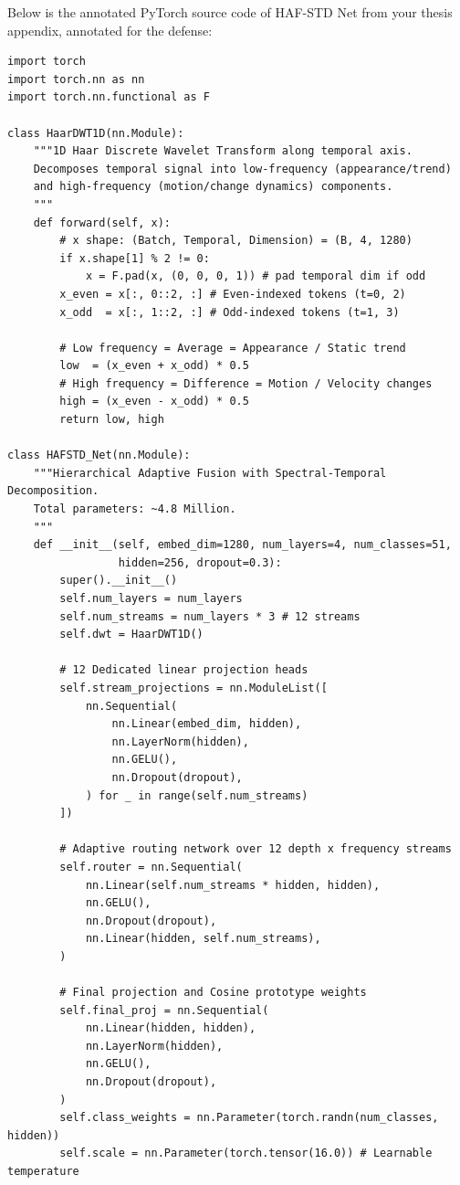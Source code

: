 \documentclass[a4paper, 11pt]{article}
\begin{document}
Below is the annotated PyTorch source code of HAF-STD Net from your thesis appendix, annotated for the defense:

\begin{lstlisting}[caption={The complete PyTorch architecture of HAF-STD Net.}]
import torch
import torch.nn as nn
import torch.nn.functional as F

class HaarDWT1D(nn.Module):
    """1D Haar Discrete Wavelet Transform along temporal axis.
    Decomposes temporal signal into low-frequency (appearance/trend)
    and high-frequency (motion/change dynamics) components.
    """
    def forward(self, x):
        # x shape: (Batch, Temporal, Dimension) = (B, 4, 1280)
        if x.shape[1] % 2 != 0:
            x = F.pad(x, (0, 0, 0, 1)) # pad temporal dim if odd
        x_even = x[:, 0::2, :] # Even-indexed tokens (t=0, 2)
        x_odd  = x[:, 1::2, :] # Odd-indexed tokens (t=1, 3)
        
        # Low frequency = Average = Appearance / Static trend
        low  = (x_even + x_odd) * 0.5
        # High frequency = Difference = Motion / Velocity changes
        high = (x_even - x_odd) * 0.5
        return low, high

class HAFSTD_Net(nn.Module):
    """Hierarchical Adaptive Fusion with Spectral-Temporal Decomposition.
    Total parameters: ~4.8 Million.
    """
    def __init__(self, embed_dim=1280, num_layers=4, num_classes=51,
                 hidden=256, dropout=0.3):
        super().__init__()
        self.num_layers = num_layers
        self.num_streams = num_layers * 3 # 12 streams
        self.dwt = HaarDWT1D()

        # 12 Dedicated linear projection heads
        self.stream_projections = nn.ModuleList([
            nn.Sequential(
                nn.Linear(embed_dim, hidden),
                nn.LayerNorm(hidden),
                nn.GELU(),
                nn.Dropout(dropout),
            ) for _ in range(self.num_streams)
        ])

        # Adaptive routing network over 12 depth x frequency streams
        self.router = nn.Sequential(
            nn.Linear(self.num_streams * hidden, hidden),
            nn.GELU(),
            nn.Dropout(dropout),
            nn.Linear(hidden, self.num_streams),
        )

        # Final projection and Cosine prototype weights
        self.final_proj = nn.Sequential(
            nn.Linear(hidden, hidden),
            nn.LayerNorm(hidden),
            nn.GELU(),
            nn.Dropout(dropout),
        )
        self.class_weights = nn.Parameter(torch.randn(num_classes, hidden))
        self.scale = nn.Parameter(torch.tensor(16.0)) # Learnable temperature


\end{lstlisting}
\end{document}
